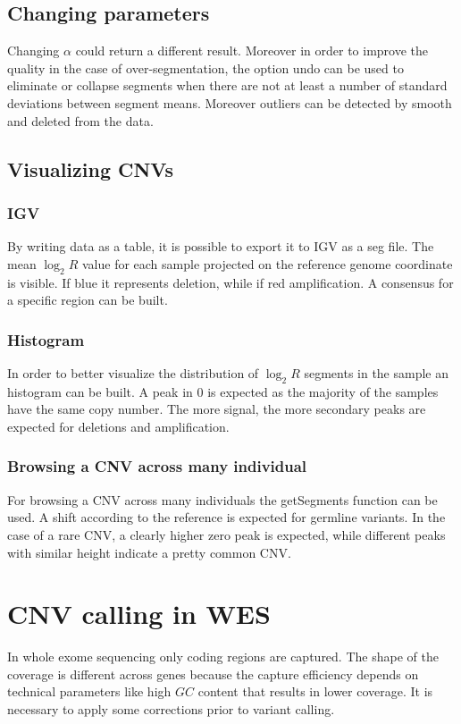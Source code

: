 		\subsection{Changing parameters}
		Changing $\alpha$ could return a different result.
		Moreover in order to improve the quality in the case of over-segmentation, the option undo can be used to eliminate or collapse segments when there are not at least a number of standard deviations between segment means.
		Moreover outliers can be detected by smooth and deleted from the data.

		\subsection{Visualizing CNVs}

			\subsubsection{IGV}
			By writing data as a table, it is possible to export it to IGV as a seg file.
			The mean $\log_2 R$ value for each sample projected on the reference genome coordinate is visible.
			If blue it represents deletion, while if red amplification.
			A consensus for a specific region can be built.

			\subsubsection{Histogram}
			In order to better visualize the distribution of $\log_2 R$ segments in the sample an histogram can be built.
			A peak in $0$ is expected as the majority of the samples have the same copy number.
			The more signal, the more secondary peaks are expected for deletions and amplification.

			\subsubsection{Browsing a CNV across many individual}
			For browsing a CNV across many individuals the getSegments function can be used.
			A shift according to the reference is expected for germline variants.
			In the case of a rare CNV, a clearly higher zero peak is expected, while different peaks with similar height indicate a pretty common CNV.

\section{CNV calling in WES}
In whole exome sequencing only coding regions are captured.
The shape of the coverage is different across genes because the capture efficiency depends on technical parameters like high $GC$ content that results in lower coverage.
It is necessary to apply some corrections prior to variant calling.

